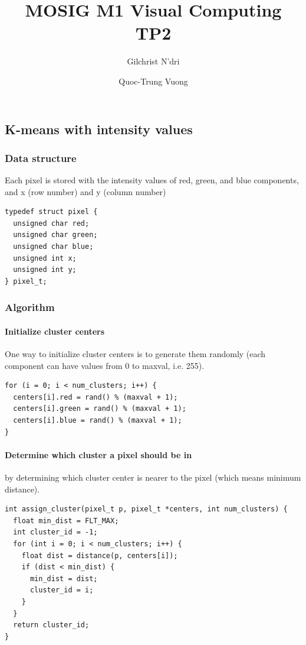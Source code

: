 \documentclass[a4paper, 10pt]{article}
\title{MOSIG M1 Visual Computing TP2}
\date{}
\author{Gilchrist N'dri \and Quoc-Trung Vuong}
\begin{document}
\maketitle
\subsection*{K-means with intensity values}
\subsubsection*{Data structure}
Each pixel is stored with the intensity values of red, green, and blue components, and x (row number) and y (column number)

\begin{lstlisting}[frame=single]
typedef struct pixel {
  unsigned char red;
  unsigned char green;
  unsigned char blue;
  unsigned int x;
  unsigned int y;
} pixel_t;
\end{lstlisting}

\subsubsection*{Algorithm}
\paragraph{Initialize cluster centers} One way to initialize cluster centers is to generate them randomly (each component can have values from 0 to maxval, i.e. 255).
\begin{lstlisting}[frame=single]
for (i = 0; i < num_clusters; i++) {
  centers[i].red = rand() % (maxval + 1);
  centers[i].green = rand() % (maxval + 1);
  centers[i].blue = rand() % (maxval + 1);
}
\end{lstlisting}

\paragraph{Determine which cluster a pixel should be in} by determining which cluster center is nearer to the pixel (which means minimum distance).
\begin{lstlisting}[frame=single]
int assign_cluster(pixel_t p, pixel_t *centers, int num_clusters) {
  float min_dist = FLT_MAX;
  int cluster_id = -1;
  for (int i = 0; i < num_clusters; i++) {
    float dist = distance(p, centers[i]);
    if (dist < min_dist) {
      min_dist = dist;
      cluster_id = i;
    }
  }
  return cluster_id;
}
\end{lstlisting}
\end{document}
